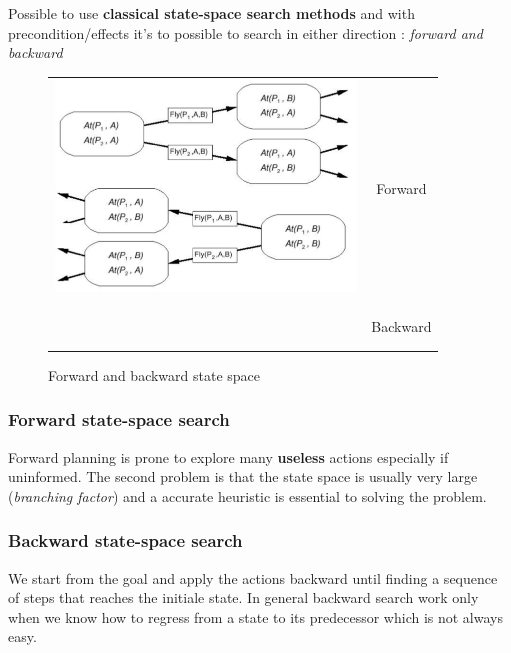 Possible to use \textbf{classical state-space search methods} and with
precondition/effects it's to possible to search in either direction :
\textit{forward and backward}


\begin{figure}[h]
    \centering
    \begin{tabular}{cc}
        \multirow{5}{*}{
            \includegraphics[width=8cm]{state_space.png} }
            & \\& \\& Forward \\ & \\& \\ & \\&\\&
            \\&  Backward \\& \\ &\\
        \end{tabular}
    \caption{Forward and backward state space}
\end{figure}

\subsubsection{Forward state-space search}

Forward  planning  is prone  to  explore  many \textbf{useless}  actions
especially if uninformed. The second problem  is that the state space is
usually  very  large  (\textit{branching factor})  and  a  accurate
heuristic is essential to solving the problem.

\subsubsection{Backward state-space search}

We start  from the goal and  apply the actions backward  until finding a
sequence of steps  that reaches the initiale state.  In general backward
search  work  only  when  we  know  how  to  regress  from  a  state  to
its  predecessor  which  is  not  always easy.  


